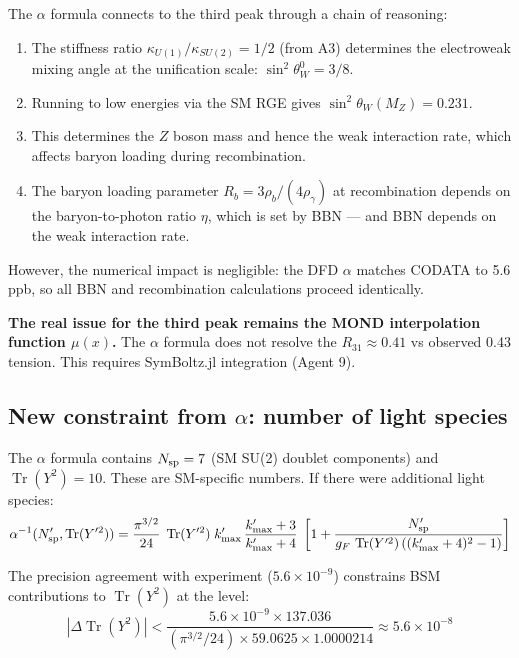 \documentclass[11pt,a4paper]{article}
\newcommand{\Tr}{\operatorname{Tr}}
\begin{document}
The $\alpha$ formula connects to the third peak through a chain of reasoning:
\begin{enumerate}
\item The stiffness ratio $\kappa_{U(1)}/\kappa_{SU(2)} = 1/2$ (from A3) determines the electroweak mixing angle at the unification scale: $\sin^2\theta_W^0 = 3/8$.
\item Running to low energies via the SM RGE gives $\sin^2\theta_W(M_Z) = 0.231$.
\item This determines the $Z$ boson mass and hence the weak interaction rate, which affects baryon loading during recombination.
\item The baryon loading parameter $R_b = 3\rho_b/(4\rho_\gamma)$ at recombination depends on the baryon-to-photon ratio $\eta$, which is set by BBN --- and BBN depends on the weak interaction rate.
\end{enumerate}

However, the numerical impact is negligible: the DFD $\alpha$ matches CODATA to 5.6 ppb, so all BBN and recombination calculations proceed identically.

\textbf{The real issue for the third peak remains the MOND interpolation function $\mu(x)$.} The $\alpha$ formula does not resolve the $R_{31} \approx 0.41$ vs observed 0.43 tension. This requires SymBoltz.jl integration (Agent 9).

\subsection{New constraint from $\alpha$: number of light species}

The $\alpha$ formula contains $N_{\rm sp} = 7$ (SM SU(2) doublet components) and $\Tr(Y^2) = 10$. These are SM-specific numbers. If there were additional light species:
\begin{equation}
\alpha^{-1}(N_{\rm sp}', \Tr(Y'^2)) = \frac{\pi^{3/2}}{24}\;\Tr(Y'^2)\;k_{\max}'\,\frac{k_{\max}'+3}{k_{\max}'+4}\;\left[1 + \frac{N_{\rm sp}'}{g_F\,\Tr(Y'^2)\,((k_{\max}'+4)^2-1)}\right]
\end{equation}

The precision agreement with experiment ($5.6 \times 10^{-9}$) constrains BSM contributions to $\Tr(Y^2)$ at the level:
\begin{equation}
|\Delta\Tr(Y^2)| < \frac{5.6 \times 10^{-9} \times 137.036}{(\pi^{3/2}/24) \times 59.0625 \times 1.0000214} \approx 5.6 \times 10^{-8}
\end{equation}
\end{document}
